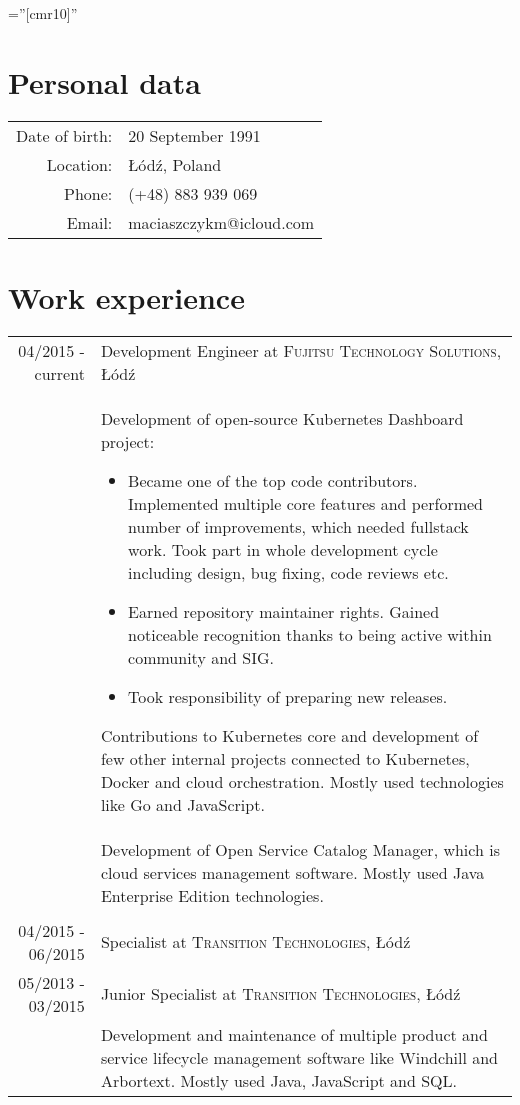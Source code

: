 \documentclass[a4paper,10pt]{article}
\begin{document}
\font\fb=''[cmr10]'' 
\par{}

\section{Personal data}

\begin{tabular}{rl}
    Date of birth: & 20 September 1991 \\
    Location: & Łódź, Poland \\
    Phone: & (+48) 883 939 069\\
    Email: & maciaszczykm@icloud.com
\end{tabular}

\section{Work experience}

\begin{tabular}{r|p{11cm}}

04/2015 - current & Development Engineer at \textsc{Fujitsu Technology Solutions}, Łódź \\
 & \footnotesize{Development of open-source Kubernetes Dashboard project:
 \begin{itemize}
 	\item Became one of the top code contributors. Implemented multiple core features and performed number of improvements, which needed fullstack work. Took part in whole development cycle including design, bug fixing, code reviews etc.
 	\item Earned repository maintainer rights. Gained noticeable recognition thanks to being active within community and SIG.
 	\item Took responsibility of preparing new releases.
 \end{itemize}
 Contributions to Kubernetes core and development of few other internal projects connected to Kubernetes, Docker and cloud orchestration. Mostly used technologies like Go and JavaScript.}\\
 & \footnotesize{Development of Open Service Catalog Manager, which is cloud services management software. Mostly used Java Enterprise Edition technologies.}\\\multicolumn{2}{c}{} \\

 
04/2015 - 06/2015 & Specialist at \textsc{Transition Technologies}, Łódź \\
05/2013 - 03/2015 & Junior Specialist at \textsc{Transition Technologies}, Łódź \\
 & \footnotesize{Development and maintenance of multiple product and service lifecycle management software like Windchill and Arbortext. Mostly used Java, JavaScript and SQL.}\\
 
\end{tabular}
\end{document}
